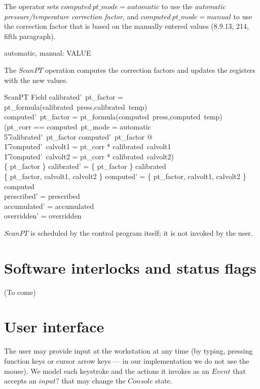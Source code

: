The operator sets $computed~pt\_mode = automatic$ to use the 
{\em automatic pressure/temperature correction factor}, 
and $computed~pt\_mode = manual$ to
use the correction factor that is based on the manually entered values (8.9.13,
214, fifth paragraph).

\begin{axdef}
	automatic, manual: VALUE 
\end{axdef}
The $ScanPT$ operation computes the correction factors and updates
the registers with the new values.

\begin{schema}{ScanPT}
	\Delta Field
\where
	calibrated'~pt\_factor = pt\_formula(calibrated~press,calibrated~temp)\\
	computed'~pt\_factor = pt\_formula(computed~press,computed~temp) \\
\also
	(\LET pt\_corr == \IF computed~pt\_mode = automatic \\  
\t5		\THEN calibrated'~pt\_factor \ELSE computed'~pt\_factor @ \\
\t1		computed'~calvolt1 = pt\_corr * calibrated~calvolt1 \land \\
\t1		computed'~calvolt2 = pt\_corr * calibrated~calvolt2) \\
\also
	\{ pt\_factor \} \ndres calibrated' = \{ pt\_factor \} \ndres calibrated \\
	\{ pt\_factor, calvolt1, calvolt2 \} \ndres computed' = \{ pt\_factor, calvolt1, calvolt2 \} \ndres computed \\
\also
	prescribed' = prescribed \\
	accumulated' = accumulated \\
	overridden' = overridden
\end{schema}
$ScanPT$ is scheduled by the control program itself; it is not invoked
by the user.

\section{Software interlocks and status flags} \label{sect:intlk}

(To come)

\newpage

\section{User interface} \label{sect:ui}

The user may provide input at the workstation at any time (by typing,
pressing function keys or cursor arrow keys --- in our implementation
we do not use the mouse).  We model each keystroke and the actions
it invokes as an $Event$ that accepts an $input?$ that may change the
$Console$ state.

